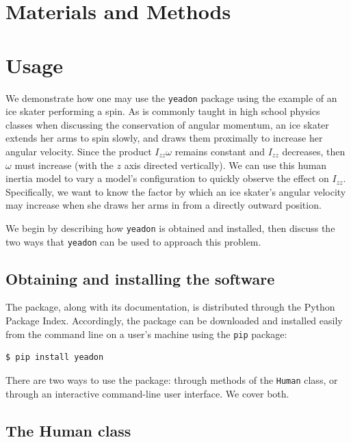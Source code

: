 \documentclass[10pt]{article}
\begin{document}
\section*{Materials and Methods}

\section*{Usage}

We demonstrate how one may use the \verb+yeadon+ package using the example of
an ice skater performing a spin. As is commonly taught in high school physics
classes when discussing the conservation of angular momentum, an ice skater
extends her arms to spin slowly, and draws them proximally to increase her
angular velocity. Since the product $I_{zz}\omega$ remains constant and $I_{zz}$
decreases, then $\omega$ must increase (with the $z$ axis directed vertically).
We can use this human inertia model to vary a model's configuration to quickly
observe the effect on $I_{zz}$. Specifically, we want to know the factor by
which an ice skater's angular velocity may increase when she draws her arms in
from a directly outward position.

We begin by describing how \verb+yeadon+ is obtained and installed, then
discuss the two ways that \verb+yeadon+ can be used to approach this problem.

\subsection*{Obtaining and installing the software}

The package, along with its documentation, is distributed through the Python
Package Index. Accordingly, the package can be downloaded and installed easily
from the command line on a user's machine using the \verb+pip+ package:

\begin{verbatim}
$ pip install yeadon
\end{verbatim}

There are two ways to use the package: through methods of the \verb+Human+
class, or through an interactive command-line user interface. We cover both.



\subsection*{The Human class}
\end{document}
